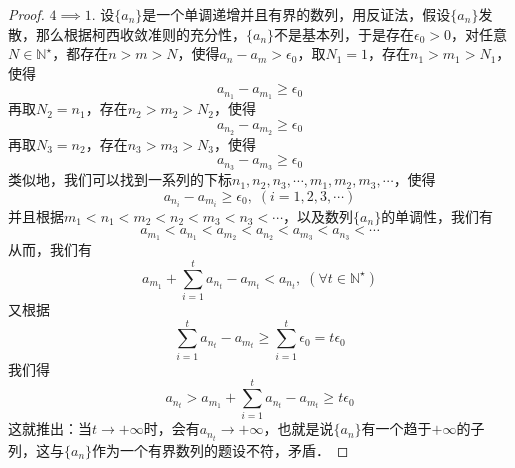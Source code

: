 \documentclass{ctexart}
\theoremstyle{definition}
\theoremstyle{definition}
\theoremstyle{plain}
\theoremstyle{plain}
\theoremstyle{plain}
\theoremstyle{definition}
\newcommand{\nat}{\mathbb{N}^\star}
\begin{document}
\begin{proof}
$4 \implies 1$.
设$\{ a_n \}$是一个单调递增并且有界的数列，用反证法，假设$\{ a_n \}$发散，那么根据柯西收敛准则的充分性，$\{ a_n \}$不是基本列，于是存在$\epsilon_0 > 0$，对任意$N \in \nat$，都存在$n > m > N$，使得$a_n - a_m > \epsilon_0$，取$N_1 = 1$，存在$n_1 > m_1 > N_1$，使得
\begin{equation}
    a_{n_1} - a_{m_1} \geq \epsilon_0
\end{equation}
再取$N_2 = n_1$，存在$n_2 > m_2 > N_2$，使得
\begin{equation}
    a_{n_2} - a_{m_2} \geq \epsilon_0
\end{equation}
再取$N_3 = n_2$，存在$n_3 > m_3 > N_3$，使得
\begin{equation}
    a_{n_3} - a_{m_3} \geq \epsilon_0
\end{equation}
类似地，我们可以找到一系列的下标$n_1,n_2,n_3,\cdots,m_1,m_2,m_3,\cdots$，使得
\begin{equation}
    a_{n_i} - a_{m_i} \geq \epsilon_0, \; (i = 1,2,3,\cdots)
\end{equation}
并且根据$m_1 < n_1 < m_2 < n_2 < m_3 < n_3 < \cdots$，以及数列$\{ a_n \}$的单调性，我们有
\begin{equation}
    a_{m_1} < a_{n_1} < a_{m_2} < a_{n_2} < a_{m_3} < a_{n_3} < \cdots
\end{equation}
从而，我们有
\begin{equation}
    a_{m_1} + \sum_{i = 1}^t a_{n_t} - a_{m_t} < a_{n_t}, \; (\forall t \in \nat)
\end{equation}
又根据
\begin{equation}
    \sum_{i=1}^{t} a_{n_t} - a_{m_t} \geq \sum_{i=1}^{t} \epsilon_0 = t \epsilon_0
\end{equation}
我们得
\begin{equation}
    a_{n_t} > a_{m_1} + \sum_{i=1}^t a_{n_t} - a_{m_t} \geq t \epsilon_0
\end{equation}
这就推出：当$t \to +\infty$时，会有$a_{n_t} \to +\infty$，也就是说$\{ a_n \}$有一个趋于$+ \infty$的子列，这与$\{ a_n \}$作为一个有界数列的题设不符，矛盾．

\end{proof}
\end{document}
